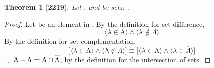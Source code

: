 \documentclass[preview]{standalone}
\newtheorem{theorem}{Theorem}
\begin{document}
\begin{theorem}[\textbf{2219}]
    Let , and \bm{$\Lambda$} be sets. 
    .
\end{theorem}
\begin{proof}
    Let \bm{$\lambda$} be an element in . 
    By the definition for set difference,
    \begin{equation*}
        \Big \langle \lambda \in \mathrm{A} \Big \rangle
            \land
        \Big \langle \lambda \notin \Lambda \Big \rangle
    \end{equation*}
    By the definition for set complementation,
    \begin{equation*}
        \bigg[
            \Big \langle \lambda \in \mathrm{A} \Big \rangle
                \land
            \Big \langle \lambda \notin \Lambda \Big \rangle
        \bigg]
            \equiv
        \bigg[
            \Big \langle \lambda \in \mathrm{A} \Big \rangle
                \land
            \Big \langle \lambda \in \overline{\Lambda} \Big \rangle
        \bigg]
    \end{equation*}
    $\therefore \text{\space} \relax{
    \mathrm{A} - \Lambda 
        = 
    \mathrm{A} \cap \overline{\Lambda}
    }$,
    by the definition for the intersection of sets.
\end{proof}
\end{document}
